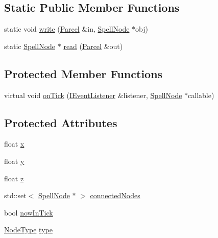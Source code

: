\subsection*{Static Public Member Functions}
\begin{DoxyCompactItemize}
\item 
static void \hyperlink{class_spell_node_a2c02575f831e8c7de826dc144279d19d}{write} (\hyperlink{class_parcel}{Parcel} \&in, \hyperlink{class_spell_node}{Spell\-Node} $\ast$obj)
\item 
static \hyperlink{class_spell_node}{Spell\-Node} $\ast$ \hyperlink{class_spell_node_abfb4d4572a2d3f59e5e25eed8ffd2c0c}{read} (\hyperlink{class_parcel}{Parcel} \&out)
\end{DoxyCompactItemize}
\subsection*{Protected Member Functions}
\begin{DoxyCompactItemize}
\item 
virtual void \hyperlink{class_spell_node_a0e8d39e7ebc6c7bd9e52eaf1be213af8}{on\-Tick} (\hyperlink{class_i_event_listener}{I\-Event\-Listener} \&listener, \hyperlink{class_spell_node}{Spell\-Node} $\ast$callable)
\end{DoxyCompactItemize}
\subsection*{Protected Attributes}
\begin{DoxyCompactItemize}
\item 
float \hyperlink{class_spell_node_a916f2a709a674dd2a61530b6acc339cc}{x}
\item 
float \hyperlink{class_spell_node_a754d80fd0fd82dbc12443b5f277b9fb4}{y}
\item 
float \hyperlink{class_spell_node_aff090331ff1bd816a22e974a50c1a180}{z}
\item 
std\-::set$<$ \hyperlink{class_spell_node}{Spell\-Node} $\ast$ $>$ \hyperlink{class_spell_node_a5073f68f588de6227430cb0abe3e161a}{connected\-Nodes}
\item 
bool \hyperlink{class_spell_node_a334bcdb7648ffd704510a6b277057fa5}{now\-In\-Tick}
\item 
\hyperlink{_spell_node_8hpp_acac9cbaeea226ed297804c012dc12b16}{Node\-Type} \hyperlink{class_spell_node_ae897f4f135608a9c71948b5f703aeb99}{type}
\end{DoxyCompactItemize}



